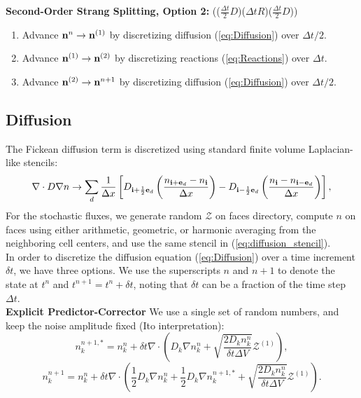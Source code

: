 \documentclass[final]{siamltex}
\def\eb  {{\bf e}}
\def\ib  {{\bf i}}
\def\nb  {{\bf n}}
\def\mZb {\bm{\mathcal{Z}}}
\def\half   {\frac{1}{2}}
\begin{document}
{\bf Second-Order Strang Splitting, Option 2:}
(($\frac{\Delta t}{2}D$)($\Delta t R$)($\frac{\Delta t}{2}D$))
\begin{enumerate}
\item Advance $\nb^n \rightarrow \nb^{(1)}$ by discretizing 
diffusion (\ref{eq:Diffusion}) over $\Delta t/2$.
\item Advance $\nb^{(1)} \rightarrow \nb^{(2)}$ by discretizing 
reactions (\ref{eq:Reactions}) over $\Delta t$.
\item Advance $\nb^{(2)} \rightarrow \nb^{n+1}$ by discretizing 
diffusion (\ref{eq:Diffusion}) over $\Delta t/2$.
\end{enumerate}

\subsection{Diffusion}
The Fickean diffusion term is discretized using standard finite volume
Laplacian-like stencils:
\begin{equation}
\nabla\cdot D\nabla n \rightarrow \sum_d \frac{1}{\Delta x}\left[D_{\ib+\half\eb_d}\left(\frac{n_{\ib + \eb_d}-n_{\ib}}{\Delta x}\right) - D_{\ib-\half\eb_d}\left(\frac{n_{\ib}-n_{\ib-\eb_d}}{\Delta x}\right)\right],\label{eq:diffusion_stencil}
\end{equation}
For the stochastic fluxes,
we generate random $\mZb$ on faces directory, compute $n$ on faces
using either arithmetic, geometric, or harmonic averaging from the 
neighboring cell centers, and use the same stencil 
in (\ref{eq:diffusion_stencil}).\\

In order to discretize the diffusion equation (\ref{eq:Diffusion}) over a time 
increment $\delta t$, we have three options.  We use the superscripts $n$
and $n+1$ to denote the state at $t^n$ and $t^{n+1}=t^n+\delta t$, noting
that $\delta t$ can be a fraction of the time step $\Delta t$.\\

{\bf Explicit Predictor-Corrector}
We use a single set of random numbers, and keep the noise amplitude
fixed (Ito interpretation):
\begin{equation}
n_k^{n+1,*} = n_k^n + \delta t \nabla\cdot\left(D_k \nabla n_k^n
+ \sqrt{\frac{2 D_k n_k^n}{\delta t\Delta V}}\mZb^{(1)}\right),
\end{equation}
\begin{equation}
n_k^{n+1} = n_k^n + \delta t\nabla\cdot\left(
\half D_k\nabla n_k^n + \half D_k\nabla n_k^{n+1,*}
+ \sqrt{\frac{2 D_k n_k^n}{\delta t\Delta V}}\mZb^{(1)}
\right).
\end{equation}
\end{document}
